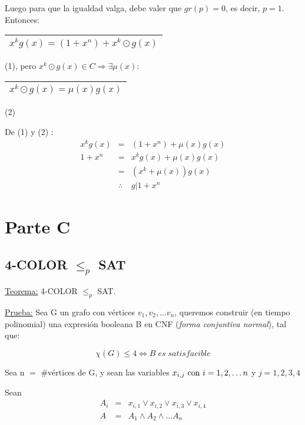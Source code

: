 \documentclass[12pt,a4paper]{report}
\begin{document}
		Luego para que la igualdad valga, debe valer que $gr(p)	= 0$, es decir, $p = 1$. Entonces: \begin{tabular}{|c|} \hline $ x^{k} g(x) = (1 + x^{n}) + x^{k} \odot g(x) $ \\ \hline \end{tabular} (1), pero $x^{k} \odot g(x) \in C \Rightarrow \exists \mu(x) :$ \begin{tabular}{|c|} \hline $ x^{k} \odot g(x) = \mu(x) g(x) $ \\ \hline \end{tabular} (2)

		\vspace{3mm}
		De (1) y (2)	:
		\begin{eqnarray}
			\nonumber x^{k} g(x) &=& (1 + x^{n}) + \mu(x) g(x) \\
			\nonumber 1 + x^{n} &=& x^{k} g(x) + \mu(x) g(x) \\
			\nonumber &=& (x^{k} + \mu(x)) g(x) \\
			\nonumber & \therefore & g | 1 + x^{n}
		\end{eqnarray}



\chapter{Parte C}

	\section{4-COLOR $\leq_{\textit{p}}$ SAT}
		\underline{Teorema:} 4-COLOR $\leq_{p}$ SAT.

		\underline{Prueba:}
		Sea G un grafo con vértices $v_{1}, v_{2}, \dotsc v_{n}$, queremos construir (en tiempo polinomial) una expresión booleana B en CNF (\textit{forma conjuntiva normal}), tal que:

		\[ \chi(G) \leq 4 \Leftrightarrow B \; es \; satisfacible \]

		Sea n $=$ \#vértices de G, y sean las variables $x_{i, j} \textup{ con } i = 1, 2, \dotsc n$ y $j = 1, 2, 3, 4$

		Sean
		\begin{eqnarray}
			\nonumber A_{i} &=& x_{i, 1} \vee x_{i, 2} \vee x_{i, 3} \vee x_{i, 4}  \\
			\nonumber A &=& A_{1} \wedge A_{2} \wedge \dotsc A_{n}
		\end{eqnarray}
\end{document}
